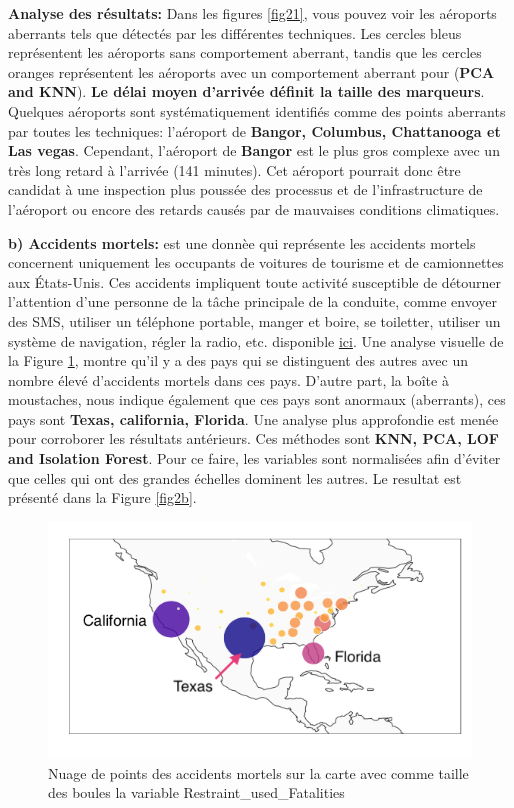 \noindent\textbf{Analyse des résultats:} 
Dans les figures \ref{fig21}, vous pouvez voir les aéroports aberrants tels que détectés par les différentes techniques. Les cercles bleus représentent les aéroports sans comportement aberrant, tandis que les cercles oranges représentent les aéroports avec un comportement aberrant pour (\textbf{PCA and KNN}). \textbf{Le délai moyen d'arrivée définit la taille des marqueurs}. Quelques aéroports sont systématiquement identifiés comme des points aberrants par toutes les techniques: l’aéroport de \textbf{Bangor, Columbus, Chattanooga et Las vegas}. Cependant, l’aéroport de \textbf{Bangor} est le plus gros complexe avec un très long retard à l’arrivée (141 minutes). Cet aéroport pourrait donc être candidat à une inspection plus poussée des processus et de l’infrastructure de l’aéroport ou encore des retards causés par de mauvaises conditions climatiques.\newl


\afterpage{\FloatBarrier}


\noindent\textbf{b) Accidents mortels:}
 est une donnèe qui représente les accidents mortels concernent uniquement les occupants de voitures de tourisme et de camionnettes aux États-Unis. Ces accidents impliquent toute activité susceptible de détourner l'attention d'une personne de la tâche principale de la conduite, comme envoyer des SMS, utiliser un téléphone portable, manger et boire, se toiletter, utiliser un système de navigation, régler la radio, etc. disponible  \href{https://www.bts.dot.gov/content/passenger-car-and-light-truck-occupants-killed-and-restraint-use}{\underline{ici}}. Une analyse visuelle de la Figure \ref{fig2}, montre qu'il y a des pays qui se distinguent des autres avec un nombre élevé d'accidents mortels dans ces pays. D'autre part, la boîte à moustaches, nous indique également que ces pays sont anormaux (aberrants), ces pays sont \textbf{Texas, california, Florida}. Une analyse plus approfondie est menée pour corroborer les résultats antérieurs. Ces méthodes sont \textbf{ KNN, PCA, LOF and Isolation Forest}. Pour ce faire, les variables sont normalisées afin d’éviter que celles qui ont des grandes échelles dominent les autres. Le resultat est présenté dans la Figure \ref{fig2b}. 
\begin{figure}[H]
    \centering
    \includegraphics[width=.5\textwidth]{ADOA/Images/fat1png.png}
    \caption{Nuage de points des accidents mortels sur la carte avec comme taille des boules la variable Restraint\_used\_Fatalities}%
    \label{fig2}
\end{figure}

